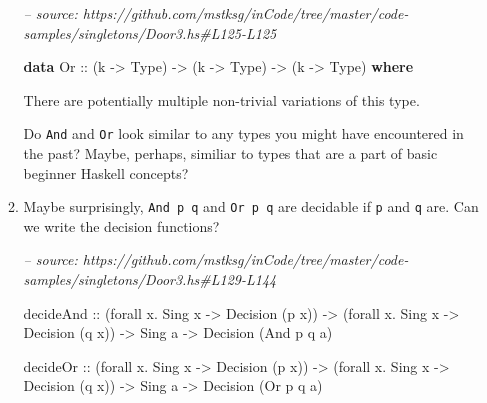\documentclass[]{article}
\newenvironment{Shaded}{}{}
\newcommand{\CommentTok}[1]{\textcolor[rgb]{0.38,0.63,0.69}{\textit{#1}}}
\newcommand{\DataTypeTok}[1]{\textcolor[rgb]{0.56,0.13,0.00}{#1}}
\newcommand{\FunctionTok}[1]{\textcolor[rgb]{0.02,0.16,0.49}{#1}}
\newcommand{\KeywordTok}[1]{\textcolor[rgb]{0.00,0.44,0.13}{\textbf{#1}}}
\newcommand{\NormalTok}[1]{#1}
\newcommand{\OtherTok}[1]{\textcolor[rgb]{0.00,0.44,0.13}{#1}}
\begin{document}
\begin{enumerate}
\begin{enumerate}
\begin{Shaded}
\begin{Highlighting}[]
\CommentTok{-- source: https://github.com/mstksg/inCode/tree/master/code-samples/singletons/Door3.hs#L125-L125}

\KeywordTok{data} \DataTypeTok{Or}\OtherTok{ ::}\NormalTok{ (k }\OtherTok{->} \DataTypeTok{Type}\NormalTok{) }\OtherTok{->}\NormalTok{ (k }\OtherTok{->} \DataTypeTok{Type}\NormalTok{) }\OtherTok{->}\NormalTok{ (k }\OtherTok{->} \DataTypeTok{Type}\NormalTok{) }\KeywordTok{where}
\end{Highlighting}
\end{Shaded}

    There are potentially multiple non-trivial variations of this type.

    Do \texttt{And} and \texttt{Or} look similar to any types you might have
    encountered in the past? Maybe, perhaps, similiar to types that are a part
    of basic beginner Haskell concepts?
  \item
    Maybe surprisingly, \texttt{And\ p\ q} and \texttt{Or\ p\ q} are decidable
    if \texttt{p} and \texttt{q} are. Can we write the decision functions?

\begin{Shaded}
\begin{Highlighting}[]
\CommentTok{-- source: https://github.com/mstksg/inCode/tree/master/code-samples/singletons/Door3.hs#L129-L144}

\NormalTok{decideAnd}
\OtherTok{    ::}\NormalTok{ (forall x}\FunctionTok{.} \DataTypeTok{Sing}\NormalTok{ x }\OtherTok{->} \DataTypeTok{Decision}\NormalTok{ (p x))}
    \OtherTok{->}\NormalTok{ (forall x}\FunctionTok{.} \DataTypeTok{Sing}\NormalTok{ x }\OtherTok{->} \DataTypeTok{Decision}\NormalTok{ (q x))}
    \OtherTok{->} \DataTypeTok{Sing}\NormalTok{ a}
    \OtherTok{->} \DataTypeTok{Decision}\NormalTok{ (}\DataTypeTok{And}\NormalTok{ p q a)}

\NormalTok{decideOr}
\OtherTok{    ::}\NormalTok{ (forall x}\FunctionTok{.} \DataTypeTok{Sing}\NormalTok{ x }\OtherTok{->} \DataTypeTok{Decision}\NormalTok{ (p x))}
    \OtherTok{->}\NormalTok{ (forall x}\FunctionTok{.} \DataTypeTok{Sing}\NormalTok{ x }\OtherTok{->} \DataTypeTok{Decision}\NormalTok{ (q x))}
    \OtherTok{->} \DataTypeTok{Sing}\NormalTok{ a}
    \OtherTok{->} \DataTypeTok{Decision}\NormalTok{ (}\DataTypeTok{Or}\NormalTok{ p q a)}
\end{Highlighting}
\end{Shaded}


\end{enumerate}
\end{enumerate}
\end{document}

